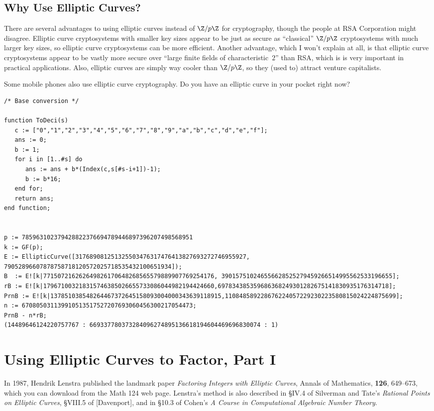 \documentclass[11pt]{report}
\begin{document}
\section{Why Use Elliptic Curves?}
There are several advantages to using elliptic curves instead
of $\Z/p\Z$ for cryptography, though the people at RSA Corporation
might disagree.  Elliptic curve cryptosystems with smaller key sizes
appear to be just as secure as ``classical'' $\Z/p\Z$ cryptosystems
with much larger key sizes, so elliptic curve cryptosystems can
be more efficient.  Another advantage, which I won't explain
at all, is that elliptic curve cryptosystems appear to be vastly
more secure over
``large finite fields of characteristic~$2$'' than RSA, which is
is very important in practical applications.  Also,
elliptic curves are simply way cooler than $\Z/p\Z$, so
they (used to) attract venture capitalists.

Some mobile phones also use elliptic curve cryptography.  Do you have an
elliptic curve in your pocket right now?


\begin{verbatim}
/* Base conversion */

function ToDeci(s)
   c := ["0","1","2","3","4","5","6","7","8","9","a","b","c","d","e","f"];
   ans := 0;
   b := 1;
   for i in [1..#s] do
      ans := ans + b*(Index(c,s[#s-i+1])-1);
      b := b*16;
   end for;  
   return ans;
end function;


p := 785963102379428822376694789446897396207498568951
k := GF(p);
E := EllipticCurve([317689081251325503476317476413827693272746955927,  79052896607878758718120572025718535432100651934]);
B  := E![k|771507216262649826170648268565579889907769254176, 390157510246556628525279459266514995562533196655];
rB := E![k|179671003218315746385026655733086044982194424660,697834385359686368249301282675141830935176314718];
PrnB := E![k|137851038548264467372645158093004000343639118915,110848589228676224057229230223580815024224875699];
n := 670805031139910513517527207693060456300217054473;
PrnB - n*rB;
(14489646124220757767 : 669337780373284096274895136618194604469696830074 : 1)
\end{verbatim}

\chapter{Using Elliptic Curves to Factor, Part I}

In 1987, Hendrik Lenstra published the landmark paper {\em Factoring
    Integers with Elliptic Curves}, Annals of Mathematics, {\bf 126},
649--673, which you can download from the Math 124 web page.
Lenstra's method is also described in \S{}IV.4 of Silverman and Tate's {\em
Rational Points on Elliptic Curves}, \S{}VIII.5 of [Davenport], and in
\S10.3 of Cohen's {\em A Course in Computational Algebraic Number
Theory}.
\end{document}

